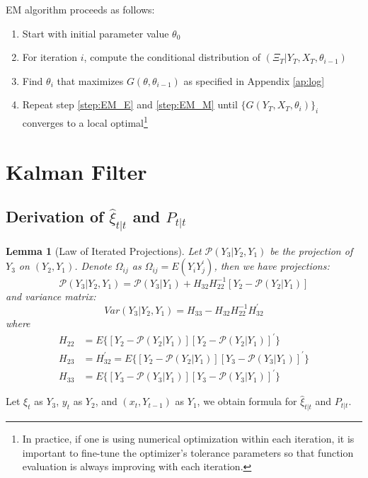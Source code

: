\documentclass[10pt, titlepage]{article}
\newtheorem{lemma}{Lemma}
\newenvironment{boenumerate}
    {\begin{enumerate}\renewcommand\labelenumi{\textbf\theenumi}}
    {\end{enumerate}}
\numberwithin{equation}{section}
\begin{document}
EM algorithm proceeds as follows:
\begin{boenumerate}
    \item Start with initial parameter value $\theta_0$
    \item \label{step:EM_E} For iteration $i$, compute the conditional distribution of $(\Xi_T|Y_T,X_T,\theta_{i-1})$
    \item \label{step:EM_M} Find $\theta_{i}$ that maximizes $G(\theta,\theta_{i-1})$ as specified in Appendix \ref{ap:log} 
    \item Repeat step \ref{step:EM_E} and \ref{step:EM_M} until $\{G(Y_T,X_T,\theta_i)\}_i$ converges to a local optimal\footnote{In practice, if one is using numerical optimization within each iteration, it is important to fine-tune the optimizer's tolerance parameters so that function evaluation is always improving with each iteration.}
\end{boenumerate}

\pagebreak
\printbibliography
\pagebreak
\appendix

\section{Kalman Filter}
\subsection{Derivation of \texorpdfstring{$\hat{\xi}_{t|t}$}{} and \texorpdfstring{$P_{t|t}$}{}} \label{ap:iter_proj}
\begin{lemma}[Law of Iterated Projections] \label{lem:1}
    Let $\mathcal{P}(Y_3|Y_2,Y_1)$ be the projection of $Y_3$ on $(Y_2, Y_1)$. Denote $\Omega_{ij}$ as $\Omega_{ij} = E(Y_iY_j^{'})$, then we have projections:
    \[
        \mathcal{P}(Y_3|Y_2,Y_1) = \mathcal{P}(Y_3|Y_1)+H_{32}H_{22}^{-1}[Y_2 - \mathcal{P}(Y_2|Y_1)]
    \]
    and variance matrix:
    \[
        Var(Y_3|Y_2,Y_1) = H_{33} - H_{32}H_{22}^{-1}H_{32}^{'}
    \]
    where 
    \begin{align*}
        H_{22} &= E\{[Y_2-\mathcal{P}(Y_2|Y_1)][Y_2-\mathcal{P}(Y_2|Y_1)]^{'}\} \\
        H_{23} &= H_{32}^{'} = E\{[Y_2-\mathcal{P}(Y_2|Y_1)][Y_3-\mathcal{P}(Y_3|Y_1)]^{'}\} \\
        H_{33} &= E\{[Y_3-\mathcal{P}(Y_3|Y_1)][Y_3-\mathcal{P}(Y_3|Y_1)]^{'}\}
    \end{align*}
\end{lemma}

Let $\xi_t$ as $Y_3$, $y_t$ as $Y_2$, and $(x_t,Y_{t-1})$ as $Y_1$, we obtain formula for $\hat{\xi}_{t|t}$ and $P_{t|t}$.
\end{document}
